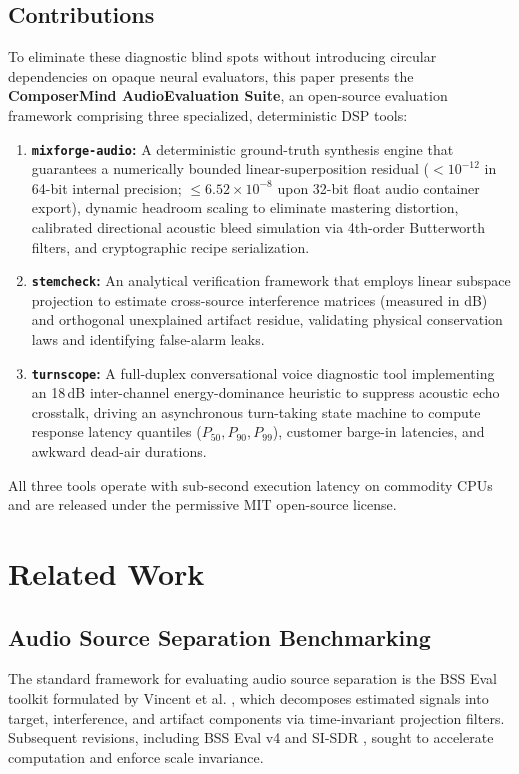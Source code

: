 \documentclass[10pt,journal,compsoc]{IEEEtran}
\begin{document}
\subsection{Contributions}
To eliminate these diagnostic blind spots without introducing circular dependencies on opaque neural evaluators, this paper presents the \textbf{ComposerMind AudioEvaluation Suite}, an open-source evaluation framework comprising three specialized, deterministic DSP tools:
\begin{enumerate}
    \item \textbf{\texttt{mixforge-audio}:} A deterministic ground-truth synthesis engine that guarantees a numerically bounded linear-superposition residual ($< 10^{-12}$ in 64-bit internal precision; $\le 6.52 \times 10^{-8}$ upon 32-bit float audio container export), dynamic headroom scaling to eliminate mastering distortion, calibrated directional acoustic bleed simulation via 4th-order Butterworth filters, and cryptographic recipe serialization.
    \item \textbf{\texttt{stemcheck}:} An analytical verification framework that employs linear subspace projection to estimate cross-source interference matrices (measured in dB) and orthogonal unexplained artifact residue, validating physical conservation laws and identifying false-alarm leaks.
    \item \textbf{\texttt{turnscope}:} A full-duplex conversational voice diagnostic tool implementing an 18\,dB inter-channel energy-dominance heuristic to suppress acoustic echo crosstalk, driving an asynchronous turn-taking state machine to compute response latency quantiles ($P_{50}, P_{90}, P_{99}$), customer barge-in latencies, and awkward dead-air durations.
\end{enumerate}

All three tools operate with sub-second execution latency on commodity CPUs and are released under the permissive MIT open-source license.

\section{Related Work}

\subsection{Audio Source Separation Benchmarking}
The standard framework for evaluating audio source separation is the BSS Eval toolkit formulated by Vincent et al. \cite{vincent2006performance}, which decomposes estimated signals into target, interference, and artifact components via time-invariant projection filters. Subsequent revisions, including BSS Eval v4 \cite{stoter20182018} and SI-SDR \cite{leroux2019sdr}, sought to accelerate computation and enforce scale invariance. 
\end{document}
